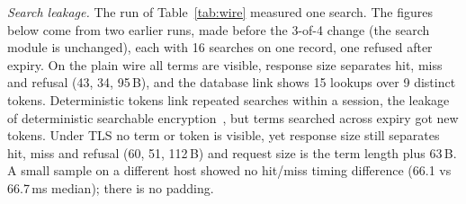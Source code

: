 \emph{Search leakage.} The run of Table~\ref{tab:wire} measured one search.
The figures below come from two earlier runs, made before the 3-of-4
change (the search module is unchanged), each with 16 searches on one record,
one refused after expiry.
On the plain wire all terms are visible, response size separates hit, miss
and refusal (43, 34, 95\,B), and the database link shows 15 lookups over 9
distinct tokens.
Deterministic tokens link repeated searches within a session, the leakage of
deterministic searchable encryption~\cite{curtmola2006sse}, but terms searched
across expiry got new tokens.
Under TLS no term or token is visible, yet response size still separates hit,
miss and refusal (60, 51, 112\,B) and request size is the term length plus
63\,B.
A small sample on a different host showed no hit/miss timing difference
(66.1 vs 66.7\,ms median); there is no padding.
